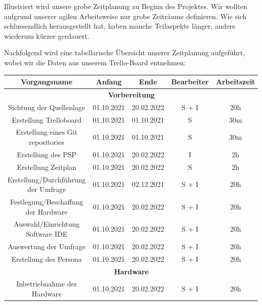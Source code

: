 Illustriert wird unsere grobe Zeitplanung zu Beginn des Projektes. Wir wollten aufgrund unserer agilen Arbeitsweise nur grobe Zeiträume definieren. Wie sich schlussendlich herausgestellt hat, haben manche Teilaspekte länger, andere wiederum kürzer gerdauert.

\newpage
Nachfolgend wird eine tabellarische Übersicht unserer Zeitplanung aufgeführt, wobei wir die Daten aus unserem Trello-Board entnehmen:
\begin{adjustwidth}{-1in}{-1in}%
	\begin{center}
		\begin{tabular}{ ccccc }
			\toprule
			{Vorgangsname} & {Anfang} & {Ende} & {Bearbeiter} & {Arbeitszeit}\\

			\midrule
			\multicolumn{5}{c}{\textbf{Vorbereitung}} \\
			{Sichtung der Quellenlage} & {01.10.2021} & {20.02.2022} & S + I & 20h\\
			{Erstellung Trelloboard} & {01.10.2021} & {01.10.2021} & S & 30m\\
			{Erstellung eines Git repositories} & {01.10.2021} & {01.10.2021} & S & 30m\\
			{Erstellung des PSP} & {01.10.2021} & {20.02.2022} & I & 2h\\
			{Erstellung Zeitplan} & {01.10.2021} & {20.02.2022} & S & 2h\\
			{Erstellung/Durchführung der Umfrage} & {01.10.2021} & {02.12.2021} & S + I & 20h\\
			{Festlegung/Beschaffung der Hardware} & {01.10.2021} & {20.02.2022} & S + I & 20h\\
			{Auswahl/Einrichtung Software IDE} & {01.10.2021} & {20.02.2022} & S + I & 20h\\
			{Auswertung der Umfrage} & {01.10.2021} & {20.02.2022} & S + I & 20h\\
			{Erstellung des Persona} & {01.10.2021} & {20.02.2022} & S + I & 20h\\

			\midrule
			\multicolumn{5}{c}{\textbf{Hardware}} \\
			{Inbetriebnahme der Hardware} & {01.10.2021} & {20.02.2022} & S + I & 20h\\


\end{tabular}
\end{center}
\end{adjustwidth}
